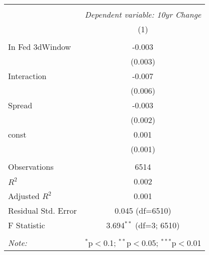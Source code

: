 \begin{table}[!htbp] \centering
\begin{tabular}{@{\extracolsep{5pt}}lc}
\\[-1.8ex]\hline
\hline \\[-1.8ex]
& \multicolumn{1}{c}{\textit{Dependent variable: 10yr Change}} \
\cr \cline{2-2}
\\[-1.8ex] & (1) \\
\hline \\[-1.8ex]
 In Fed 3dWindow & -0.003$^{}$ \\
& (0.003) \\
 Interaction & -0.007$^{}$ \\
& (0.006) \\
 Spread & -0.003$^{}$ \\
& (0.002) \\
 const & 0.001$^{}$ \\
& (0.001) \\
\hline \\[-1.8ex]
 Observations & 6514 \\
 $R^2$ & 0.002 \\
 Adjusted $R^2$ & 0.001 \\
 Residual Std. Error & 0.045 (df=6510) \\
 F Statistic & 3.694$^{**}$ (df=3; 6510) \\
\hline
\hline \\[-1.8ex]
\textit{Note:} & \multicolumn{1}{r}{$^{*}$p$<$0.1; $^{**}$p$<$0.05; $^{***}$p$<$0.01} \\
\end{tabular}
\end{table}